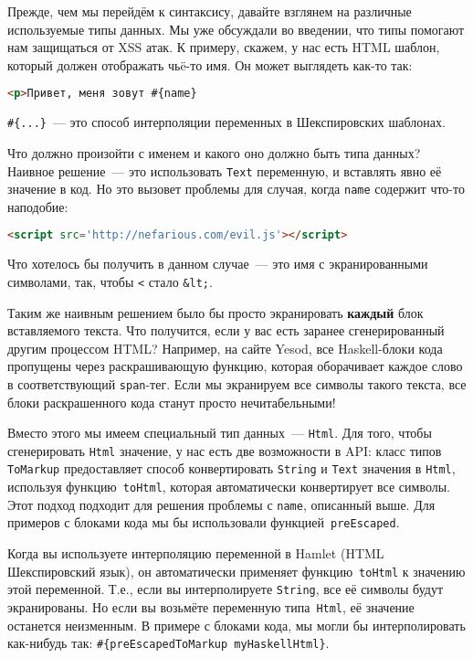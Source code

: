 Прежде, чем мы перейдём к синтаксису, давайте взглянем на различные
используемые типы данных. Мы уже обсуждали во введении, что типы помогают нам
защищаться от XSS атак. К примеру, скажем, у нас есть HTML шаблон, который
должен отображать чьë-то имя. Он может выглядеть как-то так:

\begin{lstlisting}[language=HTML]
<p>Привет, меня зовут #{name}
\end{lstlisting}

\begin{remark}
    \lstinline!#{...}!~--- это способ интерполяции переменных в Шекспировских
    шаблонах.
\end{remark}

Что должно произойти с именем и какого оно должно быть типа данных?  Наивное
решение~--- это использовать \lstinline!Text! переменную, и вставлять явно её
значение в код.  Но это вызовет проблемы для случая, когда 
\lstinline'name' содержит что-то наподобие:
\begin{lstlisting}[language=HTML]
<script src='http://nefarious.com/evil.js'></script>
\end{lstlisting}
Что хотелось бы получить в данном случае~--- это имя с экранированными
символами, так, чтобы \lstinline!<! стало \lstinline!&lt;!.

Таким же наивным решением было бы просто экранировать \textbf{каждый} блок
вставляемого текста. Что получится, если у вас есть заранее сгенерированный
другим процессом HTML? Например, на сайте Yesod, все Haskell-блоки кода
пропущены через раскрашивающую функцию, которая оборачивает каждое слово в
соответствующий \texttt{span}-тег. Если мы экранируем все символы такого
текста, все блоки раскрашенного кода станут просто нечитабельными!

Вместо этого мы имеем специальный тип данных~--- \lstinline!Html!. Для того,
чтобы сгенерировать \lstinline!Html! значение, у нас есть две возможности в
API: класс типов \lstinline!ToMarkup! предоставляет способ конвертировать
\lstinline!String! и \lstinline!Text! значения в \lstinline!Html!, используя
функцию~\lstinline!toHtml!, которая автоматически конвертирует все символы.
Этот подход подходит для решения проблемы с \texttt{name}, описанный выше. Для
примеров с блоками кода мы бы использовали функцией~\lstinline!preEscaped!.

Когда вы используете интерполяцию переменной в Hamlet (HTML Шекспировский
язык), он автоматически применяет функцию~\lstinline!toHtml! к значению этой
переменной. Т.е., если вы интерполируете \lstinline!String!, все её символы
будут экранированы. Но если вы возьмёте переменную типа~\lstinline!Html!, её
значение останется неизменным. В примере с блоками кода, мы могли бы
интерполировать как-нибудь так: \lstinline!#{preEscapedToMarkup myHaskellHtml}!.

